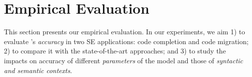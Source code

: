 \section{Empirical Evaluation}


This section presents our empirical evaluation. In our experiments,
we aim 1) to evaluate {\tool}'s {\em accuracy} in two SE
applications: code completion and code migration; 2)
to compare it with the state-of-the-art approaches; and 3) to study
the impacts on accuracy of different {\em parameters} of the model and
those of {\em syntactic and semantic contexts}.












